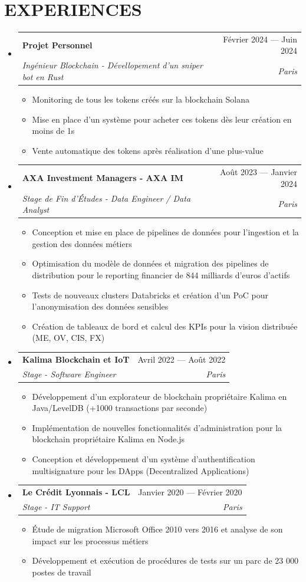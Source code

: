 \documentclass[11pt,a4paper]{article}
\makeatletter
\newcommand{\resumeItem}[1]{
  \item\footnotesize{
    {#1 \vspace{-1pt}}
  }
}
\newcommand{\resumeSubheading}[4]{
  \vspace{2pt}\item
    \begin{tabular*}{\textwidth}[t]{l@{\extracolsep{\fill}}r}
      {\footnotesize\textbf{#1}} & {\footnotesize#2} \\
      {\footnotesize\textit{#3}} & {\footnotesize\textit{#4}} \\
    \end{tabular*}\vspace{2pt}
}
\newcommand{\resumeSubHeadingListStart}{\begin{itemize}[leftmargin=0in, label={}]}
\newcommand{\resumeSubHeadingListEnd}{\end{itemize}}
\newcommand{\resumeItemListStart}{\begin{itemize}[label={\textbullet}]}
\newcommand{\resumeItemListEnd}{\end{itemize}\vspace{0pt}}
\makeatother
\begin{document}
\section{EXPERIENCES}
\resumeSubHeadingListStart
    \resumeSubheading
      {Projet Personnel}{Février 2024 --- Juin 2024}
      {Ingénieur Blockchain - Dévellopement d'un sniper bot en Rust}{Paris}
      \resumeItemListStart
        \resumeItem{Monitoring de tous les tokens créés sur la blockchain Solana}
        \resumeItem{Mise en place d'un système pour acheter ces tokens dès leur création en moins de 1s}
        \resumeItem{Vente automatique des tokens après réalisation d'une plus-value}
      \resumeItemListEnd
    \resumeSubheading
      {AXA Investment Managers - AXA IM}{Août 2023 --- Janvier 2024}
      {Stage de Fin d'Études - Data Engineer / Data Analyst}{Paris}
      \resumeItemListStart
        \resumeItem{Conception et mise en place de pipelines de données pour l'ingestion et la gestion des données métiers}
        \resumeItem{Optimisation du modèle de données et migration des pipelines de distribution pour le reporting financier de 844 milliards d'euros d'actifs}
        \resumeItem{Tests de nouveaux clusters Databricks et création d'un PoC pour l'anonymisation des données sensibles}
        \resumeItem{Création de tableaux de bord et calcul des KPIs pour la vision distribuée (ME, OV, CIS, FX)}
      \resumeItemListEnd
    \resumeSubheading
      {Kalima Blockchain et IoT}{Avril 2022 --- Août 2022}
      {Stage - Software Engineer}{Paris}
      \resumeItemListStart
        \resumeItem{Développement d'un explorateur de blockchain propriétaire Kalima en Java/LevelDB (+1000 transactions par seconde)}
        \resumeItem{Implémentation de nouvelles fonctionnalités d'administration pour la blockchain propriétaire Kalima en Node.js}
        \resumeItem{Conception et développement d'un système d'authentification multisignature pour les DApps (Decentralized Applications)}
      \resumeItemListEnd
    \resumeSubheading
      {Le Crédit Lyonnais - LCL}{Janvier 2020 --- Février 2020}
      {Stage - IT Support}{Paris}
      \resumeItemListStart
        \resumeItem{Étude de migration Microsoft Office 2010 vers 2016 et analyse de son impact sur les processus métiers}
        \resumeItem{Développement et exécution de procédures de tests sur un parc de 23 000 postes de travail}
      \resumeItemListEnd
  \resumeSubHeadingListEnd
\end{document}
